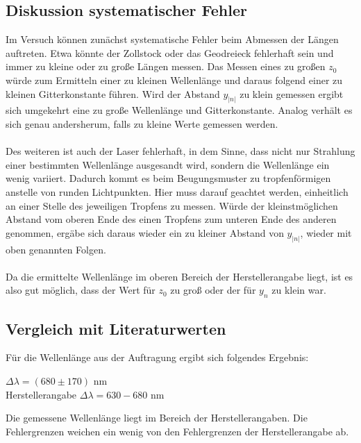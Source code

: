 \documentclass[12pt,a4paper,titlepage,headinclude,bibtotoc]{scrartcl}
\begin{document}
\subsection{Diskussion systematischer Fehler}
Im Versuch können zunächst systematische Fehler beim Abmessen der Längen auftreten. Etwa könnte der Zollstock oder das Geodreieck fehlerhaft sein und immer zu kleine oder zu große Längen messen. Das Messen eines zu großen $z_0$ würde zum Ermitteln einer zu kleinen Wellenlänge und daraus folgend einer zu kleinen Gitterkonstante führen. Wird der Abstand $y_{|n|}$ zu klein gemessen ergibt sich umgekehrt eine zu große Wellenlänge und Gitterkonstante. Analog verhält es sich genau andersherum, falls zu kleine Werte gemessen werden.\\\\
Des weiteren ist auch der Laser fehlerhaft, in dem Sinne, dass nicht nur Strahlung einer bestimmten Wellenlänge ausgesandt wird, sondern die Wellenlänge ein wenig variiert. Dadurch kommt es beim Beugungsmuster zu tropfenförmigen anstelle von runden Lichtpunkten. Hier muss darauf geachtet werden, einheitlich an einer Stelle des jeweiligen Tropfens zu messen. Würde der kleinstmöglichen Abstand vom oberen Ende des einen Tropfens zum unteren Ende des anderen genommen, ergäbe sich daraus wieder ein zu kleiner Abstand von $y_{|n|}$, wieder mit oben genannten Folgen.\\\\

Da die ermittelte Wellenlänge im oberen Bereich der Herstellerangabe liegt, ist es also gut möglich, dass der Wert für $z_0$ zu groß oder der für $y_n$ zu klein war.
  
\subsection{Vergleich mit Literaturwerten}

Für die Wellenlänge aus der Auftragung ergibt sich folgendes Ergebnis:\\
\begin{center}
$\Delta \lambda = (680 \pm 170)  $ nm\\
Herstellerangabe $ \Delta \lambda = 630-680 $ nm\\
\end{center}

Die gemessene Wellenlänge liegt im Bereich der Herstellerangaben. Die Fehlergrenzen weichen ein wenig von den Fehlergrenzen der Herstellerangabe ab.\\\\
\end{document}
